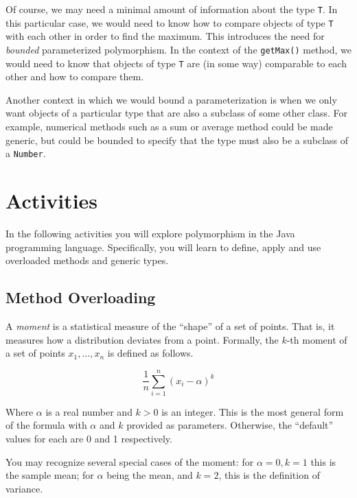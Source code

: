 \documentclass[12pt]{scrartcl}
\begin{document}
Of course, we may need a minimal amount of information about the 
type \texttt{T}.  In this particular case, we would need 
to know how to compare objects of type \texttt{T} with 
each other in order to find the maximum.  This introduces the need 
for \emph{bounded} parameterized polymorphism.  In the context of 
the \texttt{getMax()} method, we would need to know that 
objects of type \texttt{T} are (in some way) comparable 
to each other and how to compare them.  

Another context in which we would bound a parameterization is when 
we only want objects of a particular type that are also a subclass 
of some other class.  For example, numerical methods such as a sum 
or average method could be made generic, but could be bounded to 
specify that the type must also be a subclass of a \texttt{Number}.

\section*{Activities}

In the following activities you will explore polymorphism in the Java programming language.  Specifically, you will learn to define, apply 
and use overloaded methods and generic types.  

\subsection*{Method Overloading}

A \emph{moment} is a statistical measure of the ``shape'' of a set 
of points.  That is, it measures how a distribution deviates from a 
point.  Formally, the $k$-th moment of a set of points $x_1, \ldots, x_n$
is defined as follows.

\[ \frac{1}{n} \sum_{i=1}^n (x_i - \alpha)^k \]

Where $\alpha$ is a real number and $k > 0$ is an integer.  This is 
the most general form of the formula with $\alpha$ and $k$ provided as
parameters.  Otherwise, the ``default'' values for each are 0 and 1 
respectively.

You may recognize several special cases of the moment: for 
$\alpha = 0, k = 1$ this is the sample mean; for $\alpha$ being the 
mean, and $k = 2$, this is the definition of variance.  
\end{document}
